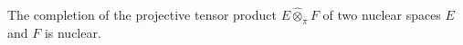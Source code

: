The completion of the projective tensor product $E \hat{\otimes}_\pi F$ of two nuclear spaces $E$ and $F$ is nuclear.

